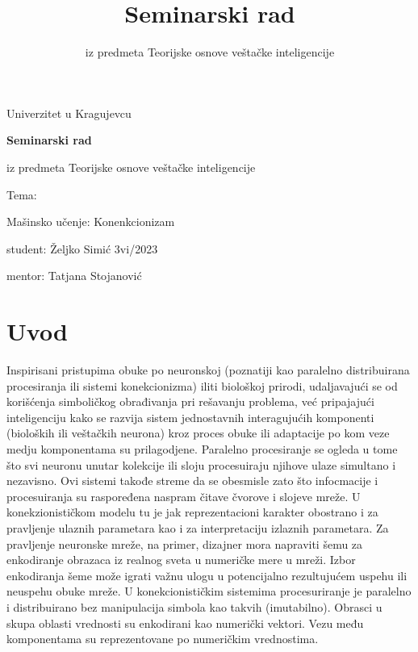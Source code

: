 \documentclass[fontsize=11bp, paper=a4]{scrarticle}
\title{Seminarski rad}
\subtitle{iz predmeta Teorijske osnove veštačke inteligencije}
\begin{document}
\begin{titlepage}
    
    \begin{center}
        
        \vspace*{8cm}
        
        \large{Univerzitet u Kragujevcu}
        
        \vspace*{1cm}

        {\bfseries \LARGE Seminarski rad}
        
        \large{iz predmeta Teorijske osnove veštačke inteligencije}
        
        \vspace*{1cm}
        \large{Tema:}

        \Large{Mašinsko učenje: Konenkcionizam}


        \vspace*{2cm}
    \end{center}
    \hfill{\parbox[s]{8cm}{student: Željko Simić 3vi/2023

    mentor: Tatjana Stojanović}}

    \hspace*{\fill} 
\end{titlepage}


\setcounter{page}{1}
\justifying
\linespread{0.8}
\cfoot[\pagemark]{\pagemark}
\ofoot[]{}
\chead[]{}
%

\section{Uvod}

Inspirisani pristupima obuke po neuronskoj (poznatiji kao paralelno distribuirana procesiranja ili sistemi konekcionizma) iliti biološkoj prirodi, udaljavajući se od korišćenja simboličkog obrađivanja\cite{symbolic} pri rešavanju problema, već pripajajući inteligenciju kako se razvija sistem jednostavnih interagujućih komponenti (bioloških ili veštačkih neurona) kroz proces obuke ili adaptacije po kom veze medju komponentama su prilagodjene. Paralelno procesiranje se ogleda u tome što svi neuronu unutar kolekcije ili sloju procesuiraju njihove ulaze simultano i nezavisno. Ovi sistemi takođe streme da se obesmisle zato što infocmacije i procesuiranja su raspoređena naspram čitave čvorove i slojeve mreže. U konekzionističkom modelu tu je jak reprezentacioni karakter obostrano i za pravljenje ulaznih parametara kao i za interpretaciju izlaznih parametara. Za pravljenje neuronske mreže, na primer, dizajner mora napraviti šemu za enkodiranje obrazaca iz realnog sveta u numeričke mere u mreži. Izbor enkodiranja šeme može igrati važnu ulogu u potencijalno rezultujućem uspehu ili neuspehu obuke mreže. 
U konekcionističkim sistemima procesuriranje je paralelno i distribuirano bez manipulacija simbola kao takvih (imutabilno). Obrasci u skupa oblasti vrednosti su enkodirani kao numerički vektori. Vezu među komponentama su reprezentovane po numeričkim vrednostima. 
\end{document}
